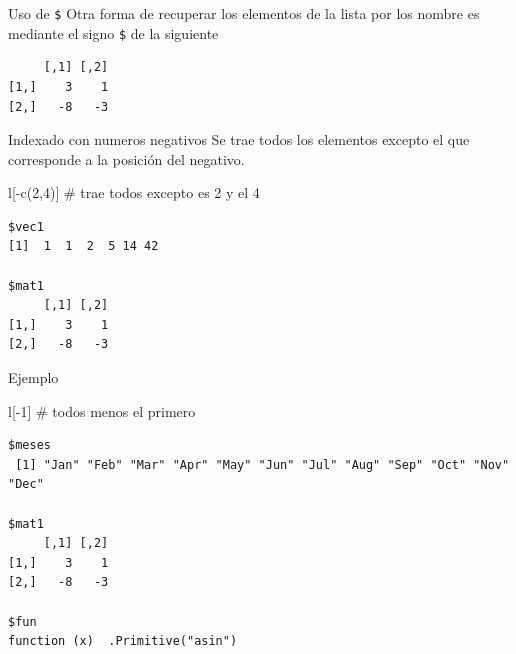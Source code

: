 \documentclass[
  ignorenonframetext,
  aspectratio=169,
  spanish,
]{beamer}
\newenvironment{Shaded}{\begin{snugshade}}{\end{snugshade}}
\newcommand{\CommentTok}[1]{\textcolor[rgb]{0.37,0.37,0.37}{#1}}
\newcommand{\DecValTok}[1]{\textcolor[rgb]{0.68,0.00,0.00}{#1}}
\newcommand{\FunctionTok}[1]{\textcolor[rgb]{0.28,0.35,0.67}{#1}}
\newcommand{\NormalTok}[1]{\textcolor[rgb]{0.00,0.23,0.31}{#1}}
\newcommand{\SpecialCharTok}[1]{\textcolor[rgb]{0.37,0.37,0.37}{#1}}
\begin{document}
\begin{frame}[fragile]{Uso de \texttt{\$}}
\label{uso-de-1}
Otra forma de recuperar los elementos de la lista por los nombre es
mediante el signo \texttt{\$} de la siguiente

\begin{Shaded}
\end{Shaded}

\begin{verbatim}
     [,1] [,2]
[1,]    3    1
[2,]   -8   -3
\end{verbatim}
\end{frame}

\begin{frame}[fragile]{Indexado con numeros negativos}
\label{indexado-con-numeros-negativos}
Se trae todos los elementos excepto el que corresponde a la posición del
negativo.

\begin{Shaded}
\begin{Highlighting}[]
\NormalTok{l[}\SpecialCharTok{{-}}\FunctionTok{c}\NormalTok{(}\DecValTok{2}\NormalTok{,}\DecValTok{4}\NormalTok{)] }\CommentTok{\# trae todos excepto es 2 y el 4 }
\end{Highlighting}
\end{Shaded}

\begin{verbatim}
$vec1
[1]  1  1  2  5 14 42

$mat1
     [,1] [,2]
[1,]    3    1
[2,]   -8   -3
\end{verbatim}
\end{frame}

\begin{frame}[fragile]{Ejemplo}
\label{ejemplo}
\begin{Shaded}
\begin{Highlighting}[]
\NormalTok{l[}\SpecialCharTok{{-}}\DecValTok{1}\NormalTok{] }\CommentTok{\# todos menos el primero }
\end{Highlighting}
\end{Shaded}

\begin{verbatim}
$meses
 [1] "Jan" "Feb" "Mar" "Apr" "May" "Jun" "Jul" "Aug" "Sep" "Oct" "Nov" "Dec"

$mat1
     [,1] [,2]
[1,]    3    1
[2,]   -8   -3

$fun
function (x)  .Primitive("asin")
\end{verbatim}
\end{frame}
\end{document}
